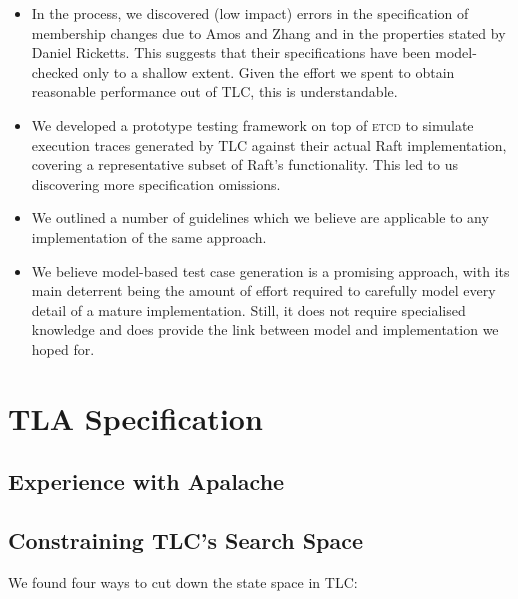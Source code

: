 \documentclass[a4paper]{article}
\newcommand{\tname}[1]{\textsc{#1}\xspace}
\newcommand{\etcd}{\tname{etcd}}
\begin{document}
\begin{itemize}
    \item In the process, we discovered (low impact) errors in the
    specification of membership changes due to Amos and Zhang and in the
    properties stated by Daniel Ricketts.
    This suggests that their specifications have been model-checked only to a shallow extent.
    Given the effort we spent to obtain reasonable performance out of TLC, this is understandable.

    \item We developed a prototype testing framework on top of \etcd to simulate execution traces generated by TLC against their actual Raft implementation, covering a representative subset of Raft's functionality.
    This led to us discovering more specification omissions.

    \item We outlined a number of guidelines which we believe are applicable to any implementation of the same approach.

    \item We believe model-based test case generation is a promising approach, with its main deterrent being the amount of effort required to carefully model every detail of a mature implementation. Still, it does not require specialised knowledge and does provide the link between model and implementation we hoped for.

\end{itemize}

\section{TLA Specification}

\subsection{Experience with Apalache}

\subsection{Constraining TLC's Search Space}

We found four ways to cut down the state space in TLC:
\end{document}
